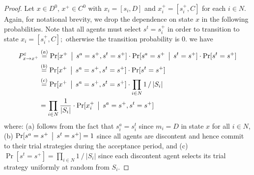 \begin{proof}
Let $x\in D^0$, $x^+\in C^0$ with $x_i = [s_i,D]$ and $x_i^+ = [s_i^+,C]$  for each $i\in N.$ Again, for notational brevity, we drop the dependence on state $x$ in the following probabilities. Note that all agents must select $s^t = s_i^+$ in order to transition to state $x_i = [s_i^+,C];$ otherwise the transition probability is 0.
we have
{\allowdisplaybreaks[3]\begin{align*}
P^\varepsilon_{x\to x^+} & \stackrel{(a)}{=}\operatorname{ Pr }[x^+\,\bigm\vert\, s^a = s^+, s^t = s^+]\cdot \operatorname{ Pr }[ s^a = s^+\,\bigm\vert\, s^t = s^+]\cdot\operatorname{ Pr }[ s^t = s^+]\\
& \stackrel{(b)}{=}\operatorname{ Pr }[x^+\,\bigm\vert\, s^a = s^+, s^t = s^+]\cdot\operatorname{ Pr }[ s^t = s^+]\\
& \stackrel{(c)}{=}\operatorname{ Pr }[x^+\,\bigm\vert\, s^a = s^+, s^t = s^+]\cdot\prod_{i\in N}1\mathop{/}|S_i|\\
& = \prod_{i\in N}{1\over|S_i|}\cdot\operatorname{ Pr }[x_i^+\,\bigm\vert\, s^a = s^+,s^t = s^+]
\end{align*}}
where:
(a) follows from the fact that $s_i^a = s_i^t$ since $m_i = D$ in state $x$ for all $i\in N$,
(b) $\operatorname{ Pr }[ s^a = s^+\,\bigm\vert\, s^t = s^+] = 1$ since all agents are discontent and hence commit to their trial strategies during the acceptance period, and
(c) $\Pr[ s^t = s^+] = \prod_{i\in N}1\mathop{/}|S_i|$ since each discontent agent selects its trial strategy uniformly at random from $S_i$.



\end{proof}
